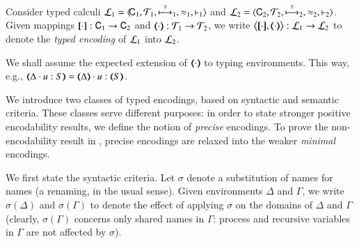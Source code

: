 \begin{definition}%
\label{def:tenc}
        Consider typed calculi
        $\mathcal{L}_1=\langle \!\mathsf{C}_1, {\cal{T}}_1, \stackrel{\tau}{\longmapsto}_1, \approx_1, \vdash_1 \rangle$
        and
        $\mathcal{L}_2=\langle \mathsf{C}_2, {\cal{T}}_2, \stackrel{\tau}{\longmapsto}_2, \approx_2, \vdash_2 \rangle$.
	Given mappings $[\!\![\cdot]\!\!]: \mathsf{C}_1 \to \mathsf{C}_2$ and
	$(\!\!\langle\cdot\rangle\!\!): {\cal{T}}_1 \to {\cal{T}}_2$, 
	we write 
		$\enco{\map{\cdot}, \mapt{\cdot}} : 
	\tyl{L}_1 \to \tyl{L}_2$ to denote the \emph{typed encoding} of $\mathcal{L}_1$ into $\mathcal{L}_2$.
\end{definition}

\smallskip 

\noi We shall assume the expected extension of $(\!\!\langle\cdot\rangle\!\!)$ to typing
environments. This way, e.g., $\mapt{\Delta \cat u:S} = \mapt{\Delta} \cat u:\mapt{S}$.

We introduce two classes of typed encodings, 
based on syntactic and semantic criteria.
These classes 
serve different purposes:
in order to state stronger positive encodability results, %
we define the notion of {\em precise} encodings.
To prove the non-encodability result in , 
precise encodings are relaxed into the weaker {\em minimal} encodings. 

We first state the 
syntactic criteria. 
Let $\sigma$ denote a substitution of names for names (a renaming, in the usual sense). Given environments $\Delta$ and $\Gamma$,
we write $\sigma(\Delta)$ and $\sigma(\Gamma)$ to denote the effect of applying $\sigma$ on the 
domains of $\Delta$ and $\Gamma$
(clearly, $\sigma(\Gamma)$ concerns only shared names in $\Gamma$: process and recursive variables in $\Gamma$ are not affected by $\sigma$). 

\smallskip 

